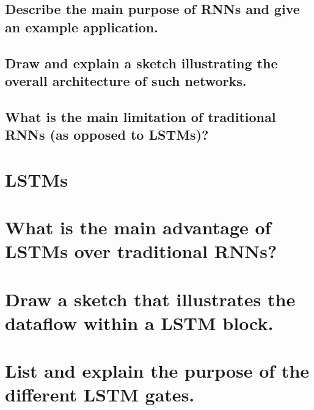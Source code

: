 \subsection{Describe the main purpose of RNNs and give an example application.}

\subsection{Draw and explain a sketch illustrating the overall  architecture of such networks.}

\subsection{What is the main limitation of traditional RNNs (as opposed to LSTMs)?}

\section{LSTMs}

\section{What is the main advantage of LSTMs over traditional RNNs?}

\section{Draw a sketch that illustrates the dataflow within a LSTM block.}

\section{List and explain the purpose of the different LSTM gates.}

\subsubsection{}
